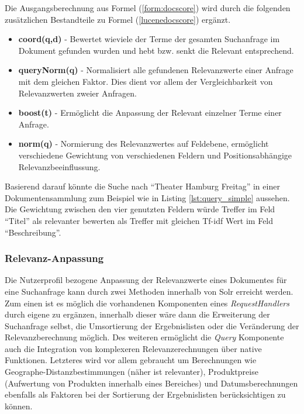 Die Ausgangsberechnung aus Formel (\ref{form:docscore}) wird durch die folgenden zusätzlichen Bestandteile zu Formel (\ref{lucenedocscore}) ergänzt.

\begin{itemize}
\item \textbf{coord(q,d)} - Bewertet wieviele der Terme der gesamten Suchanfrage im Dokument gefunden wurden und hebt bzw. senkt die Relevant entsprechend.
\item \textbf{queryNorm(q)} - Normalisiert alle gefundenen Relevanzwerte einer Anfrage mit dem gleichen Faktor. Dies dient vor allem der Vergleichbarkeit von Relevanzwerten zweier Anfragen.
\item \textbf{boost(t)} - Ermöglicht die Anpassung der Relevant einzelner Terme einer Anfrage.
\item \textbf{norm(q)} - Normierung des Relevanzwertes auf Feldebene, ermöglicht verschiedene Gewichtung von verschiedenen Feldern und Positionsabhängige Relevanzbeeinflussung.
\end{itemize}

Basierend darauf könnte die Suche nach ``Theater Hamburg Freitag'' in einer Dokumentensammlung zum Beispiel wie in Listing \ref{lst:query_simple} aussehen. Die Gewichtung zwischen den vier genutzten Feldern würde Treffer im Feld ``Titel'' als relevanter bewerten als Treffer mit gleichen Tf-idf Wert im Feld ``Beschreibung''. \citep{TFIDFSimilarity}



\subsubsection{Relevanz-Anpassung} \label{sec:searchrelevance}

Die Nutzerprofil bezogene Anpassung der Relevanzwerte eines Dokumentes für eine Suchanfrage kann durch zwei Methoden innerhalb von Solr erreicht werden. Zum einen ist es möglich die vorhandenen Komponenten eines \textit{RequestHandlers} durch eigene zu ergänzen, innerhalb dieser wäre dann die Erweiterung der Suchanfrage selbst, die Umsortierung der Ergebnislisten oder die Veränderung der Relevanzberechnung möglich. Des weiteren ermöglicht die \textit{Query} Komponente auch die Integration von komplexeren Relevanzerechnungen über native Funktionen. Letzteres wird vor allem gebraucht um Berechnungen wie Geographe-Distanzbestimmungen (näher ist relevanter), Produktpreise (Aufwertung von Produkten innerhalb eines Bereiches) und Datumsberechnungen ebenfalls als Faktoren bei der Sortierung der Ergebnislisten berücksichtigen zu können.

